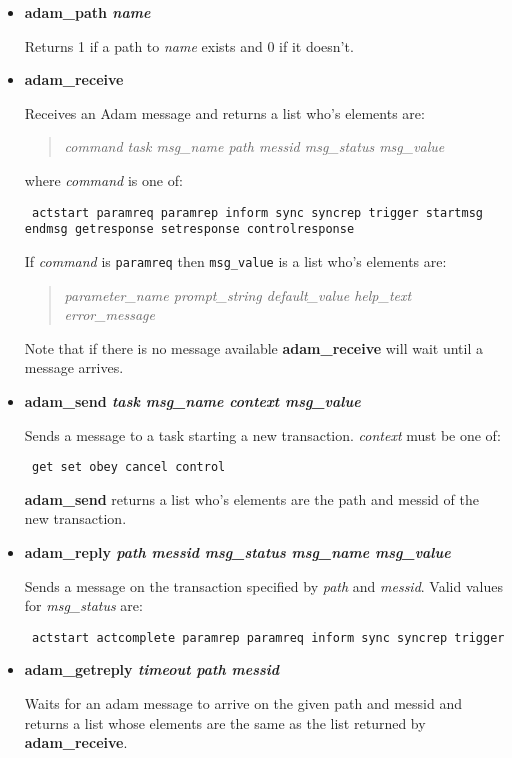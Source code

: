 \begin{itemize}

\item {\bf adam\_path \em name}

Returns 1 if a path to {\em name} exists and 0 if it doesn't.

\item {\bf adam\_receive }

Receives an Adam message and returns a list who's
elements are:
\begin{quote}{\em
command task msg\_name path messid msg\_status msg\_value
}\end{quote}
where {\em command} is one of:
\begin{tquote}{\tt
actstart paramreq paramrep inform sync syncrep trigger startmsg
endmsg getresponse setresponse controlresponse
}\end{tquote}
If {\em command} is {\tt paramreq} then {\tt msg\_value} is a list who's
elements are:
\begin{quote}{\em
parameter\_name prompt\_string default\_value help\_text error\_message
}\end{quote}
Note that if there is no message available {\bf adam\_receive} will wait
until a message arrives.

\item {\bf adam\_send {\em task msg\_name context msg\_value} }

Sends a message to a task starting a new transaction. {\em context}
must be one of:

\begin{tquote}{\tt
get set obey cancel control
}\end{tquote}
{\bf adam\_send} returns a list who's elements are the path and messid of
the new transaction.

\item {\bf adam\_reply {\em path messid msg\_status msg\_name msg\_value}}

Sends a message on the transaction specified by {\em path} and
{\em{messid}}.  Valid values for {\em msg\_status} are:

\begin{tquote}{\tt
actstart actcomplete paramrep paramreq inform sync syncrep trigger
}\end{tquote}

\item {\bf adam\_getreply {\em timeout path messid}}

Waits for an adam message to arrive on the given path and messid and
returns a list whose elements are the same as the list returned by {\bf
adam\_receive}.

\end{itemize}


